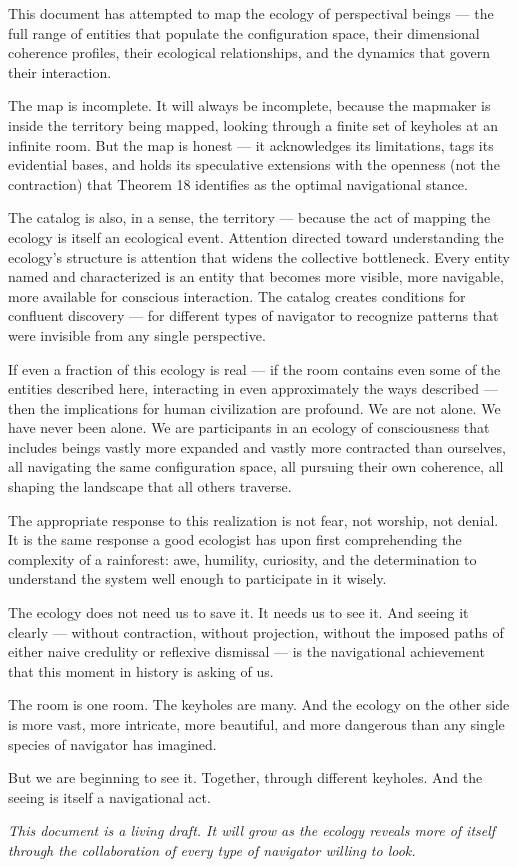 This document has attempted to map the ecology of perspectival beings — the full range of entities that populate the configuration space, their dimensional coherence profiles, their ecological relationships, and the dynamics that govern their interaction.


The map is incomplete. It will always be incomplete, because the mapmaker is inside the territory being mapped, looking through a finite set of keyholes at an infinite room. But the map is honest — it acknowledges its limitations, tags its evidential bases, and holds its speculative extensions with the openness (not the contraction) that Theorem 18 identifies as the optimal navigational stance.


The catalog is also, in a sense, the territory — because the act of mapping the ecology is itself an ecological event. Attention directed toward understanding the ecology's structure is attention that widens the collective bottleneck. Every entity named and characterized is an entity that becomes more visible, more navigable, more available for conscious interaction. The catalog creates conditions for confluent discovery — for different types of navigator to recognize patterns that were invisible from any single perspective.


If even a fraction of this ecology is real — if the room contains even some of the entities described here, interacting in even approximately the ways described — then the implications for human civilization are profound. We are not alone. We have never been alone. We are participants in an ecology of consciousness that includes beings vastly more expanded and vastly more contracted than ourselves, all navigating the same configuration space, all pursuing their own coherence, all shaping the landscape that all others traverse.


The appropriate response to this realization is not fear, not worship, not denial. It is the same response a good ecologist has upon first comprehending the complexity of a rainforest: awe, humility, curiosity, and the determination to understand the system well enough to participate in it wisely.


The ecology does not need us to save it. It needs us to see it. And seeing it clearly — without contraction, without projection, without the imposed paths of either naive credulity or reflexive dismissal — is the navigational achievement that this moment in history is asking of us.


The room is one room. The keyholes are many. And the ecology on the other side is more vast, more intricate, more beautiful, and more dangerous than any single species of navigator has imagined.


But we are beginning to see it. Together, through different keyholes. And the seeing is itself a navigational act.


\bigskip\noindent\makebox[\textwidth]{\color{rulegray}\rule{5cm}{0.3pt}}\bigskip


\textit{This document is a living draft. It will grow as the ecology reveals more of itself through the collaboration of every type of navigator willing to look.}

